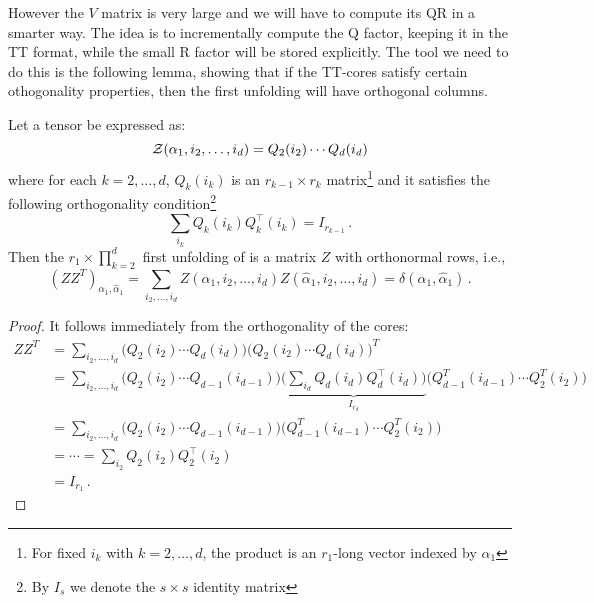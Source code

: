 However the $V$ matrix is very large and we will have to compute its QR in a smarter way. The idea is to incrementally compute the Q factor, keeping it in the TT format, while the small R factor will be stored explicitly. The tool we need to do this is the following lemma, showing that if the TT-cores satisfy certain othogonality properties, then the first unfolding will have orthogonal columns.
\begin{Lemma}
  Let a tensor \Z be expressed as:
  \begin{equation*}
    \mathcal{Z}(\alpha_1,i_2,\ldots,i_d) = Q_2(i_2) \cdots Q_d(i_d)
  \end{equation*}
  where for each $k = 2,\ldots,d$, $Q_k(i_k)$ is an $r_{k-1} \times r_k$ matrix\footnote{For fixed $i_k$ with $k=2,\ldots,d$, the product is an $r_1$-long vector indexed by $\alpha_1$} and it satisfies the following orthogonality condition\footnote{By $I_s$ we denote the $s \times s$ identity matrix}
  \begin{equation} \label{eq:orth_cond}
    \sum_{i_k} Q_k(i_k) Q_k^{\top}(i_k) = I_{r_{k-1}}\, .
  \end{equation}
  Then the $r_1 \times \prod_{k=2}^d$ first unfolding of \Z is a matrix $Z$ with orthonormal rows, i.e.,
  \begin{equation*}
    (Z Z^T)_{\alpha_1,\hat{\alpha}_1} = \sum_{i_2,\ldots,i_d} Z(\alpha_1,i_2,\ldots,i_d) Z(\hat{\alpha}_1,i_2,\ldots,i_d) = \delta(\alpha_1,\hat{\alpha}_1)\, .
  \end{equation*}

  \begin{proof}
    It follows immediately from the orthogonality of the cores:
    \begin{equation*}
      \begin{split}
        ZZ^T &= \sum_{i_2,\ldots,i_d} \Big( Q_2(i_2) \cdots Q_d(i_d) \Big) \Big( Q_2(i_2) \cdots Q_d(i_d) \Big)^T \\
        &= \sum_{i_2,\ldots,i_d} \Big( Q_2(i_2) \cdots Q_{d-1}(i_{d-1}) \Big)
        \underbrace{\Big( \sum_{i_d} Q_d(i_d) Q_d^{\top}(i_d) \Big)}_{I_{r_d}}
        \Big( Q_{d-1}^T(i_{d-1}) \cdots Q_2^T(i_2) \Big) \\
        &= \sum_{i_2,\ldots,i_d} \Big( Q_2(i_2) \cdots Q_{d-1}(i_{d-1}) \Big)
        \Big( Q_{d-1}^T(i_{d-1}) \cdots Q_2^T(i_2) \Big) \\
        &= \cdots = \sum_{i_2} Q_2(i_2) Q_2^{\top}(i_2) \\
        &= I_{r_1} \, .
      \end{split}
    \end{equation*}
  \end{proof}
\end{Lemma}

